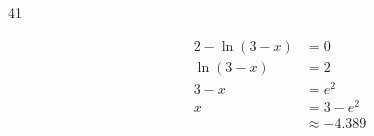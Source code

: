 \documentclass{exam}
\begin{document}
\begin{description}





      \item[41] 
        \begin{align*}
          2 - \ln(3 - x) & = 0 \\
          \ln(3 - x)     & = 2 \\
          3 - x          & = e^2 \\
          x              & = 3 - e^2 \\
                         & \approx \boxed{-4.389} \\
        \end{align*}


\end{description}
\end{document}
